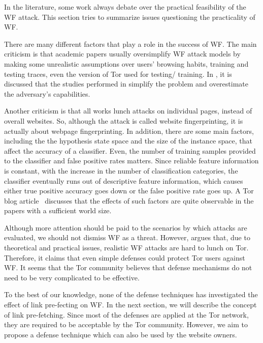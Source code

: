 In the literature, some work always debate over the practical feasibility of the WF attack. This section tries to summarize issues questioning the practicality of WF.

There are many different factors that play a role in the success of WF.
The main criticism is that academic papers usually oversimplify WF attack models by making some unrealistic assumptions over users' browsing habits, training and testing traces, even the version of Tor used for testing/ training.
In \cite{juarez14}, it is discussed that the studies performed in \cite{cai2012touching, herrmann2009, panchenko11, wang2013improved, shi2009} simplify the problem and overestimate the adversary's capabilities.

Another criticism is that all works lunch attacks on individual pages, instead of overall websites.
So, although the attack is called website fingerprinting, it is actually about webpage fingerprinting.
In addition, there are some main factors, including the the hypothesis state space and the size of the instance space, that affect the accuracy of a classifier.
Even, the number of training samples provided to the classifier and false positive rates matters.
Since reliable feature information is constant, with the increase in the number of classification categories, the classifier eventually runs out of descriptive feature information, which causes either true positive accuracy goes down or the false positive rate goes up.
A Tor blog article~\cite{TorBlog} discusses that the effects of such factors are quite observable in the papers with a sufficient world size.

Although more attention should be paid to the scenarios by which attacks are evaluated, we should not dismiss WF as a threat. However, \cite{TorBlog} argues that, due to theoretical and practical issues, realistic WF attacks are hard to lunch on Tor. Therefore, it claims that even simple defenses could protect Tor users against WF. It seems that the Tor community believes that defense mechanisms do not need to be very complicated to be effective.

To the best of our knowledge, none of the defense techniques has investigated the effect of link pre-fecting on WF. In the next section, we will describe the concept of link pre-fetching. Since most of the defenses are applied at the Tor network, they are required to be acceptable by the Tor community. However, we aim to propose a defense technique which can also be used by the website owners. 
